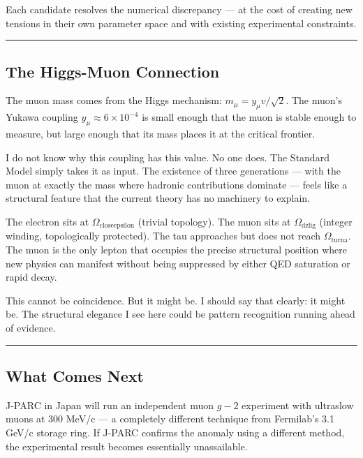 \documentclass[12pt,a4paper]{article}
\begin{document}
Each candidate resolves the numerical discrepancy --- at the cost of creating new tensions in their own parameter space and with existing experimental constraints.

\begin{center}
\rule{0.5\textwidth}{0.4pt}
\end{center}

\subsection{The Higgs-Muon Connection}

The muon mass comes from the Higgs mechanism: $m_{\mu} = y_{\mu} v / \sqrt{2}$. The muon's Yukawa coupling $y_{\mu} \approx 6 \times 10^{-4}$ is small enough that the muon is stable enough to measure, but large enough that its mass places it at the critical frontier.

I do not know why this coupling has this value. No one does. The Standard Model simply takes it as input. The existence of three generations --- with the muon at exactly the mass where hadronic contributions dominate --- feels like a structural feature that the current theory has no machinery to explain.

The electron sits at $\Omega_{\text{closeepsilon}}$ (trivial topology). The muon sits at $\Omega_{\text{dzlig}}$ (integer winding, topologically protected). The tau approaches but does not reach $\Omega_{\text{turna}}$. The muon is the only lepton that occupies the precise structural position where new physics can manifest without being suppressed by either QED saturation or rapid decay.

This cannot be coincidence. But it might be. I should say that clearly: it might be. The structural elegance I see here could be pattern recognition running ahead of evidence.

\begin{center}
\rule{0.5\textwidth}{0.4pt}
\end{center}

\subsection{What Comes Next}

J-PARC in Japan will run an independent muon $g-2$ experiment with ultraslow muons at 300 MeV/c --- a completely different technique from Fermilab's 3.1 GeV/c storage ring. If J-PARC confirms the anomaly using a different method, the experimental result becomes essentially unassailable.
\end{document}

